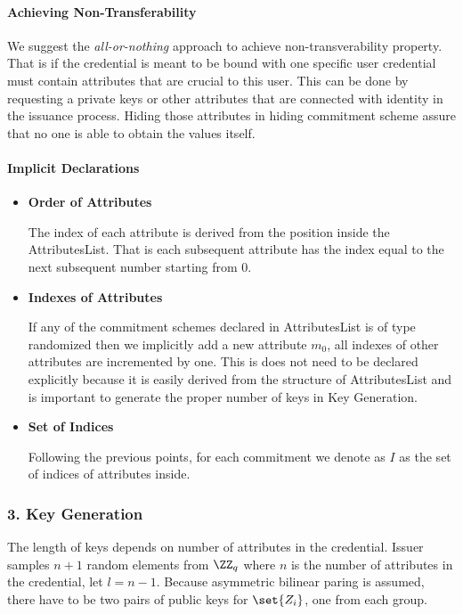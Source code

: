 \paragraph{Achieving Non-Transferability}

We suggest the \emph{all-or-nothing} approach to achieve non-transverability property. That is if the credential is meant to be bound with one specific user credential must contain attributes that are crucial to this user. This can be done by requesting a private keys or other attributes that are connected with identity in the issuance process. Hiding those attributes in \textsf{hiding} commitment scheme assure that no one is able to obtain the values itself.


\paragraph{Implicit Declarations}
\begin{itemize}[label=$\circ$]
    \item \textbf{Order of Attributes}
    
    The index of each attribute is derived from the position inside the \textsf{AttributesList}. That is each subsequent attribute has the index equal to the next subsequent number starting from 0.
    
    \item \textbf{Indexes of Attributes}
    
    If any of the commitment schemes declared in \textsf{AttributesList} is of type \textsf{randomized} then we implicitly add a new attribute $m_0$, all indexes of other attributes are incremented by one.
    This is does not need to be declared explicitly because it is easily derived from the structure of \textsf{AttributesList} and is important to generate the proper number of keys in Key Generation.
    
    \item \textbf{Set of Indices}
    
    Following the previous points, for each commitment we denote as $I$ as the set of indices of attributes inside. 

\end{itemize}



\subsubsection{3. Key Generation}
The length of keys depends on number of attributes in the credential. Issuer samples $n + 1$ random elements from $\ZZ_q$ where $n$ is the number of attributes in the credential, let $l = n - 1$. Because asymmetric bilinear paring is assumed, there have to be two pairs of public keys for $\set{Z_i}$, one from each group.

